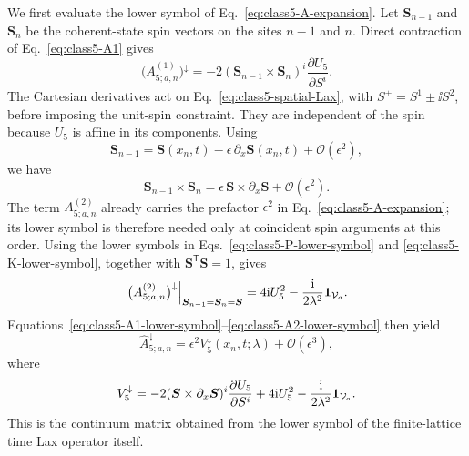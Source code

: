 We first evaluate the lower symbol of Eq.~\eqref{eq:class5-A-expansion}.
Let $\boldsymbol S_{n-1}$ and $\boldsymbol S_n$ be the coherent-state spin
vectors on the sites $n-1$ and $n$.  Direct contraction of
Eq.~\eqref{eq:class5-A1} gives
\begin{equation}
\bigl(A^{(1)}_{5;a,n}\bigr)^\downarrow
=
-2
(\boldsymbol S_{n-1}\times\boldsymbol S_n)^i
\frac{\partial U_5}{\partial S^i}.
\label{eq:class5-A1-lower-symbol}
\end{equation}
The Cartesian derivatives act on Eq.~\eqref{eq:class5-spatial-Lax}, with
$S^\pm=S^1\pm\ii S^2$, before imposing the unit-spin constraint.  They are
independent of the spin because $U_5$ is affine in its components.  Using
\begin{equation}
\boldsymbol S_{n-1}
=
\boldsymbol S(x_n,t)-\epsilon\,\partial_x\boldsymbol S(x_n,t)
+\mathcal O(\epsilon^2),
\end{equation}
we have
\begin{equation}
\boldsymbol S_{n-1}\times\boldsymbol S_n
=
\epsilon\,\boldsymbol S\times\partial_x\boldsymbol S
+\mathcal O(\epsilon^2).
\label{eq:class5-neighbour-cross-product}
\end{equation}
The term $A^{(2)}_{5;a,n}$ already carries the prefactor $\epsilon^2$ in
Eq.~\eqref{eq:class5-A-expansion}; its lower symbol is therefore needed only
at coincident spin arguments at this order.  Using the lower symbols in
Eqs.~\eqref{eq:class5-P-lower-symbol} and
\eqref{eq:class5-K-lower-symbol}, together with
$\boldsymbol S^{\mathsf T}\boldsymbol S=1$, gives
\begin{equation}
\left.\bigl(A^{(2)}_{5;a,n}\bigr)^\downarrow\right|_{\boldsymbol S_{n-1}=\boldsymbol S_n=\boldsymbol S}
=
4\mathrm{i} U_5^2-\frac{\mathrm{i}}{2\lambda^2}\mathbf{1}_{\mathcal V_a}.
\label{eq:class5-A2-lower-symbol}
\end{equation}
Equations~\eqref{eq:class5-A1-lower-symbol}--\eqref{eq:class5-A2-lower-symbol}
then yield
\begin{equation}
\widehat A_{5;a,n}^{\downarrow}
=
\epsilon^2 V_5^{\downarrow}(x_n,t;\lambda)
+\mathcal O(\epsilon^3),
\label{eq:class5-A-lower-expansion}
\end{equation}
where
\begin{equation}
V_5^{\downarrow}
=
-2
(\boldsymbol S\times\partial_x\boldsymbol S)^i
\frac{\partial U_5}{\partial S^i}
+4\mathrm{i} U_5^2
-\frac{\mathrm{i}}{2\lambda^2}\mathbf{1}_{\mathcal V_a}.
\label{eq:class5-Vdown-direct}
\end{equation}
This is the continuum matrix obtained from the lower symbol of the finite-lattice
time Lax operator itself.

